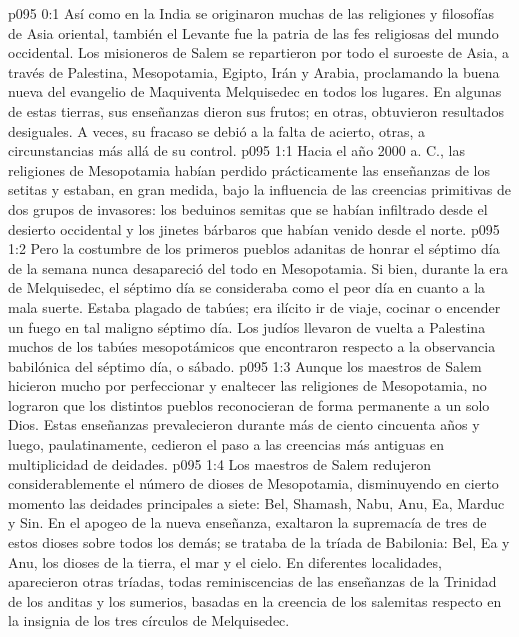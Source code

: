 \author{Melquisedec}
\vs p095 0:1 Así como en la India se originaron muchas de las religiones y filosofías de Asia oriental, también el Levante fue la patria de las fes religiosas del mundo occidental. Los misioneros de Salem se repartieron por todo el suroeste de Asia, a través de Palestina, Mesopotamia, Egipto, Irán y Arabia, proclamando la buena nueva del evangelio de Maquiventa Melquisedec en todos los lugares. En algunas de estas tierras, sus enseñanzas dieron sus frutos; en otras, obtuvieron resultados desiguales. A veces, su fracaso se debió a la falta de acierto, otras, a circunstancias más allá de su control.
\vs p095 1:1 Hacia el año 2000 a. C., las religiones de Mesopotamia habían perdido prácticamente las enseñanzas de los setitas y estaban, en gran medida, bajo la influencia de las creencias primitivas de dos grupos de invasores: los beduinos semitas que se habían infiltrado desde el desierto occidental y los jinetes bárbaros que habían venido desde el norte.
\vs p095 1:2 Pero la costumbre de los primeros pueblos adanitas de honrar el séptimo día de la semana nunca desapareció del todo en Mesopotamia. Si bien, durante la era de Melquisedec, el séptimo día se consideraba como el peor día en cuanto a la mala suerte. Estaba plagado de tabúes; era ilícito ir de viaje, cocinar o encender un fuego en tal maligno séptimo día. Los judíos llevaron de vuelta a Palestina muchos de los tabúes mesopotámicos que encontraron respecto a la observancia babilónica del séptimo día, o sábado.
\vs p095 1:3 Aunque los maestros de Salem hicieron mucho por perfeccionar y enaltecer las religiones de Mesopotamia, no lograron que los distintos pueblos reconocieran de forma permanente a un solo Dios. Estas enseñanzas prevalecieron durante más de ciento cincuenta años y luego, paulatinamente, cedieron el paso a las creencias más antiguas en multiplicidad de deidades.
\vs p095 1:4 Los maestros de Salem redujeron considerablemente el número de dioses de Mesopotamia, disminuyendo en cierto momento las deidades principales a siete: Bel, Shamash, Nabu, Anu, Ea, Marduc y Sin. En el apogeo de la nueva enseñanza, exaltaron la supremacía de tres de estos dioses sobre todos los demás; se trataba de la tríada de Babilonia: Bel, Ea y Anu, los dioses de la tierra, el mar y el cielo. En diferentes localidades, aparecieron otras tríadas, todas reminiscencias de las enseñanzas de la Trinidad de los anditas y los sumerios, basadas en la creencia de los salemitas respecto en la insignia de los tres círculos de Melquisedec.
